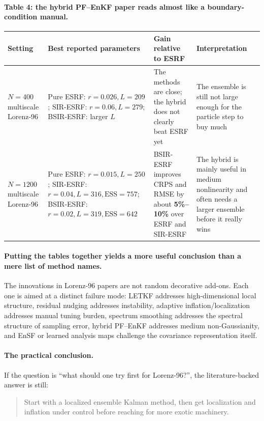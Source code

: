 \documentclass[12pt,a4paper]{article}
\begin{document}
\paragraph{Table 4: the hybrid PF--EnKF paper reads almost like a boundary-condition manual.}
\begin{center}
\small
\begin{tabular}{>{\raggedright\arraybackslash}p{3.0cm} >{\raggedright\arraybackslash}p{3.0cm} >{\raggedright\arraybackslash}p{3.7cm} >{\raggedright\arraybackslash}p{4.0cm}}
\toprule
Setting & Best reported parameters & Gain relative to ESRF & Interpretation \\
\midrule
\(N=400\) multiscale Lorenz-96 & Pure ESRF: \(r=0.026,L=209\); SIR-ESRF: \(r=0.06,L=279\); BSIR-ESRF: larger \(L\) & The methods are close; the hybrid does not clearly beat ESRF yet & The ensemble is still not large enough for the particle step to buy much \\
\(N=1200\) multiscale Lorenz-96 & Pure ESRF: \(r=0.015,L=250\); SIR-ESRF: \(r=0.04,L=316,\text{ESS}=757\); BSIR-ESRF: \(r=0.02,L=319,\text{ESS}=642\) & BSIR-ESRF improves CRPS and RMSE by about \textbf{5\%--10\%} over ESRF and SIR-ESRF & The hybrid is mainly useful in medium nonlinearity and often needs a larger ensemble before it really wins \\
\bottomrule
\end{tabular}
\end{center}

\paragraph{Putting the tables together yields a more useful conclusion than a mere list of method names.}
The innovations in Lorenz-96 papers are not random decorative add-ons. Each one is aimed at a distinct failure mode: LETKF addresses high-dimensional local structure, residual nudging addresses instability, adaptive inflation/localization addresses manual tuning burden, spectrum smoothing addresses the spectral structure of sampling error, hybrid PF--EnKF addresses medium non-Gaussianity, and EnSF or learned analysis maps challenge the covariance representation itself.

\paragraph{The practical conclusion.}
If the question is ``what should one try first for Lorenz-96?'', the literature-backed answer is still:
\begin{quote}
Start with a localized ensemble Kalman method, then get localization and inflation under control before reaching for more exotic machinery.
\end{quote}
\end{document}
